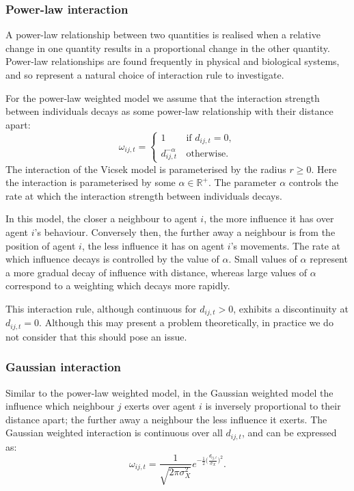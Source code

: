 \subsubsection{Power-law interaction}

A power-law relationship between two quantities is realised when a relative change in
one quantity results in a proportional change in the other quantity. Power-law
relationships are found frequently in physical and biological systems, and so represent a
natural choice of interaction rule to investigate.

For the power-law weighted model we assume that the interaction strength between
individuals decays as some power-law relationship with their distance apart:
\begin{equation}
    \label{eq:power_law_interaction}
	\omega_{ij,t} =
	\begin{cases}
		1                  & \, \text{if } d_{ij,t} = 0, \\
		d_{ij,t}^{-\alpha} & \, \text{otherwise}.
	\end{cases}
\end{equation}
The interaction of the Vicsek model is parameterised by the radius $r \geq 0$. Here the
interaction is parameterised by some $\alpha\in\mathbb{R}^+$. The parameter $\alpha$
controls the rate at which the interaction strength between individuals decays. 

In this model, the closer a neighbour to agent $i$, the more influence it has over agent
$i$'s behaviour. Conversely then, the further away a neighbour is from the position of
agent $i$, the less influence it has on agent $i$'s movements. The rate at which influence
decays is controlled by the value of $\alpha$. Small values of $\alpha$ represent a more
gradual decay of influence with distance, whereas large values of $\alpha$ correspond to a
weighting which decays more rapidly.

This interaction rule, although continuous for $d_{ij,t} > 0$, exhibits a discontinuity at
$d_{ij,t}=0$. Although this may present a problem theoretically, in practice we do not
consider that this should pose an issue.

\subsubsection{Gaussian interaction}

Similar to the power-law weighted model, in the Gaussian weighted model the influence
which neighbour $j$ exerts over agent $i$ is inversely proportional to their distance
apart; the further away a neighbour the less influence it exerts. The Gaussian weighted
interaction is continuous over all $d_{ij,t}$, and can be expressed as:
\begin{equation}
    \label{eq:gaussian_interaction}
	\omega_{ij,t} =
	\frac{1}{\sqrt{2\pi\sigma_X^2}}
	e^{-\frac{1}{2}\big(\frac{d_{ij,t}}{\sigma_X}\big)^2}.
\end{equation}

